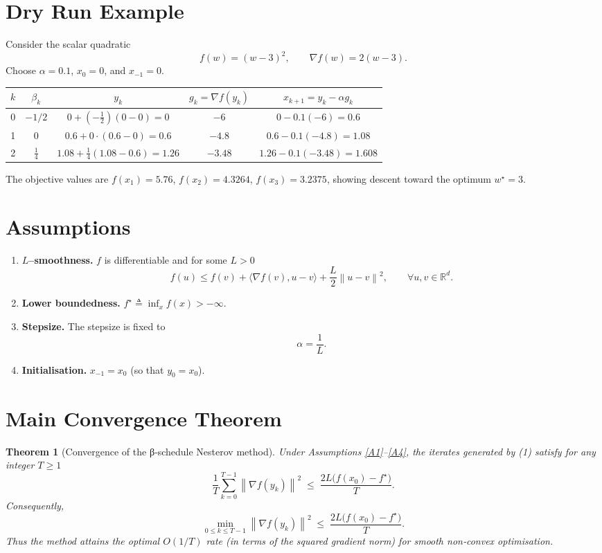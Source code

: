\documentclass{article}
\newtheorem{theorem}{Theorem}
\newcommand{\grad}{\nabla}
\newcommand{\norm}[1]{\left\|#1\right\|}
\newcommand{\inner}[2]{\langle #1,#2\rangle}
\begin{document}
\section*{Dry Run Example}
Consider the scalar quadratic
\[
f(w)=(w-3)^2,\qquad \grad f(w)=2(w-3).
\]
Choose $\alpha=0.1$, $x_{0}=0$, and $x_{-1}=0$.

\begin{center}
\begin{tabular}{c|c|c|c|c}
$k$ & $\beta_k$ & $y_k$ & $g_k=\grad f(y_k)$ & $x_{k+1}=y_k-\alpha g_k$ \\ \hline
0 & $-1/2$ & $0+(-\tfrac12)(0-0)=0$ & $-6$ & $0-0.1(-6)=0.6$ \\[2mm]
1 & $0$   & $0.6+0\cdot(0.6-0)=0.6$ & $-4.8$ & $0.6-0.1(-4.8)=1.08$ \\[2mm]
2 & $\tfrac{1}{4}$ & $1.08+\tfrac14(1.08-0.6)=1.26$ & $-3.48$ & $1.26-0.1(-3.48)=1.608$ 
\end{tabular}
\end{center}
The objective values are $f(x_1)=5.76$, $f(x_2)=4.3264$, $f(x_3)=3.2375$, showing descent toward the optimum $w^\star=3$.

\section*{Assumptions}
\begin{enumerate}[label={\bf A\arabic*}.]
\item \label{A1} \textbf{$L$–smoothness.}  $f$ is differentiable and for some $L>0$
\[
f(u)\le f(v)+\inner{\grad f(v)}{u-v}+\frac{L}{2}\norm{u-v}^2,
\qquad\forall u,v\in\mathbb{R}^d .
\tag{A1}
\]
\item \label{A2} \textbf{Lower boundedness.} $f^\star\triangleq\inf_{x}f(x)>-\infty$.
\item \label{A3} \textbf{Stepsize.} The stepsize is fixed to
\[
\alpha=\frac{1}{L}.
\tag{A3}
\]
\item \label{A4} \textbf{Initialisation.} $x_{-1}=x_0$ (so that $y_0=x_0$).
\end{enumerate}

\section*{Main Convergence Theorem}
\begin{theorem}[Convergence of the β‑schedule Nesterov method]\label{thm:main}
Under Assumptions \ref{A1}–\ref{A4}, the iterates generated by (1) satisfy for any integer $T\ge1$
\[
\frac{1}{T}\sum_{k=0}^{T-1}\norm{\grad f(y_k)}^{2}
\;\le\;
\frac{2L\bigl(f(x_0)-f^\star\bigr)}{T}.
\tag{2}
\]
Consequently,
\[
\min_{0\le k\le T-1}\norm{\grad f(y_k)}^{2}
\;\le\;
\frac{2L\bigl(f(x_0)-f^\star\bigr)}{T}.
\tag{3}
\]
Thus the method attains the optimal $O(1/T)$ rate (in terms of the squared gradient norm) for smooth non‑convex optimisation.
\end{theorem}
\end{document}
